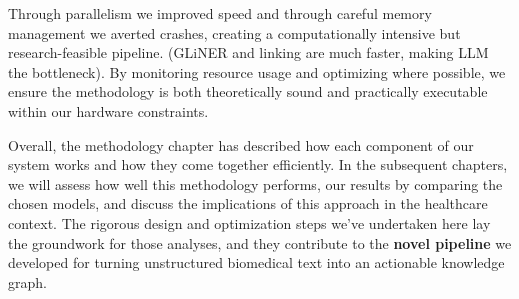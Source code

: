 Through parallelism we improved speed and through careful memory management we averted crashes, creating a computationally intensive but research-feasible pipeline. (GLiNER and linking are much faster, making LLM the bottleneck). By monitoring resource usage and optimizing where possible, we ensure the methodology is both theoretically sound and practically executable within our hardware constraints.

Overall, the methodology chapter has described how each component of our system works and how they come together efficiently. In the subsequent chapters, we will assess how well this methodology performs, our results by comparing the chosen models, and discuss the implications of this approach in the healthcare context. The rigorous design and optimization steps we've undertaken here lay the groundwork for those analyses, and they contribute to the \textbf{novel pipeline} we developed for turning unstructured biomedical text into an actionable knowledge graph.